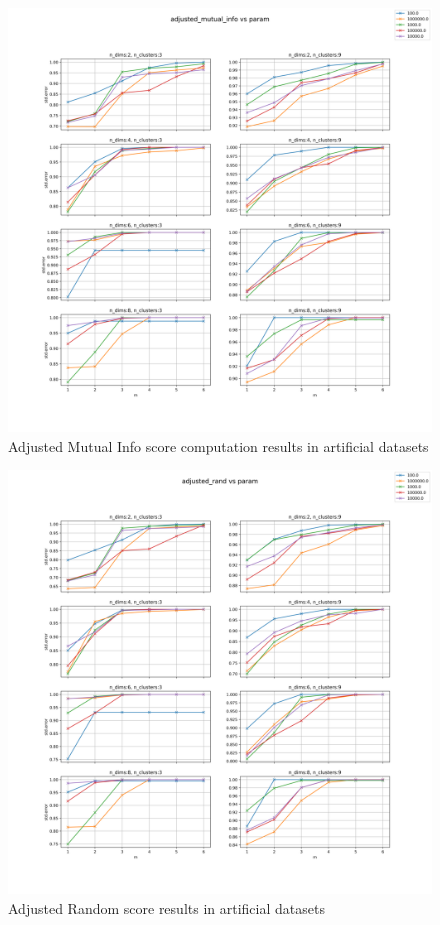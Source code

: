 \begin{figure}[!ht]
    \includegraphics[width=\linewidth]{images/additional_experiments/adjusted_mutual_info.png}
    \caption{Adjusted Mutual Info score computation results in artificial datasets}
    \label{fig:adjusted_mutual_info}
\end{figure}

\begin{figure}[!ht]
    \includegraphics[width=\linewidth]{images/additional_experiments/adjusted_rand.png}
    \caption{Adjusted Random score results in artificial datasets}
    \label{fig:adjusted_rand}
\end{figure}
